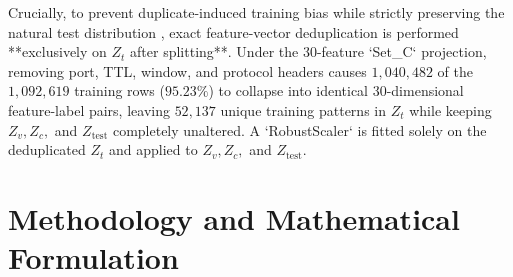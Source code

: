 ﻿\documentclass[conference]{IEEEtran}
\begin{document}
Crucially, to prevent duplicate-induced training bias while strictly preserving the natural test distribution \cite{b1}, exact feature-vector deduplication is performed **exclusively on $Z_t$ after splitting**. Under the 30-feature `Set_C` projection, removing port, TTL, window, and protocol headers causes $1,040,482$ of the $1,092,619$ training rows ($95.23\%$) to collapse into identical 30-dimensional feature-label pairs, leaving $52,137$ unique training patterns in $Z_t$ while keeping $Z_v, Z_c,$ and $Z_{\text{test}}$ completely unaltered. A `RobustScaler` is fitted solely on the deduplicated $Z_t$ and applied to $Z_v, Z_c,$ and $Z_{\text{test}}$.

\section{Methodology and Mathematical Formulation}
\end{document}
